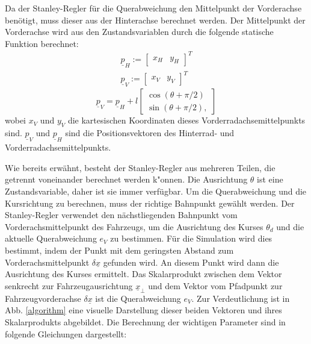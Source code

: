 \documentclass[arbeit=studie,oneside,BCOR=12mm]{ArbeitRST}
\begin{document}
Da der Stanley-Regler für die Querabweichung den Mittelpunkt der Vorderachse
benötigt, muss dieser aus der Hinterachse berechnet werden. Der Mittelpunkt der
Vorderachse wird aus den Zustandsvariablen durch die folgende statische
Funktion berechnet: 
\begin{gather}
  \underline{p}_H := 
  \begin{bmatrix}
    x_H & y_H
  \end{bmatrix}^T \\
  \underline{p}_V := 
  \begin{bmatrix}
    x_V & y_V
  \end{bmatrix}^T
  \label{eq:Rear Axle and Front Axle}
\end{gather}
\begin{equation}
  \underline{p}_V = \underline{p}_H + l 
  \begin{bmatrix}
    \cos(\theta + \pi/2) \\ 
    \sin(\theta + \pi/2),
  \end{bmatrix}
  \label{eq:Transformation from Rear Axle to Front Axle}
\end{equation}
wobei $x_V$ und $y_V$ die kartesischen Koordinaten dieses Vorderradachsemittelpunkts sind.
$\underline{p}_V$ und $\underline{p}_H$ sind die Positionsvektoren des
Hinterrad- und Vorderradachsemittelpunkts.

Wie bereits erwähnt, besteht der Stanley-Regler aus mehreren Teilen, die
getrennt voneinander berechnet werden k"onnen. Die Ausrichtung $\theta$ ist eine
Zustandsvariable, daher ist sie immer verfügbar. Um die Querabweichung und die
Kursrichtung zu berechnen, muss der richtige Bahnpunkt gewählt werden. Der
Stanley-Regler verwendet den nächstliegenden Bahnpunkt vom
Vorderachsmittelpunkt des Fahrzeugs, um die Ausrichtung des Kurses $\theta_d$
und die aktuelle Querabweichung $e_{V}$ zu bestimmen. Für die Simulation wird
dies bestimmt, indem der Punkt mit dem geringsten Abstand zum
Vorderachsmittelpunkt $\delta\underline{x}$ gefunden wird. An diesem Punkt wird
dann die Ausrichtung des Kurses ermittelt. Das Skalarprodukt zwischen dem
Vektor senkrecht zur Fahrzeugausrichtung $\underline{x}_{\perp}$ und dem Vektor
vom Pfadpunkt zur Fahrzeugvorderachse $\delta\underline{x}$ ist die
Querabweichung $e_{V}$. Zur Verdeutlichung ist in Abb. \ref{algorithm} eine visuelle
Darstellung dieser beiden Vektoren und ihres Skalarprodukts abgebildet. Die Berechnung
der wichtigen Parameter sind in folgende Gleichungen dargestellt: \\
\end{document}
